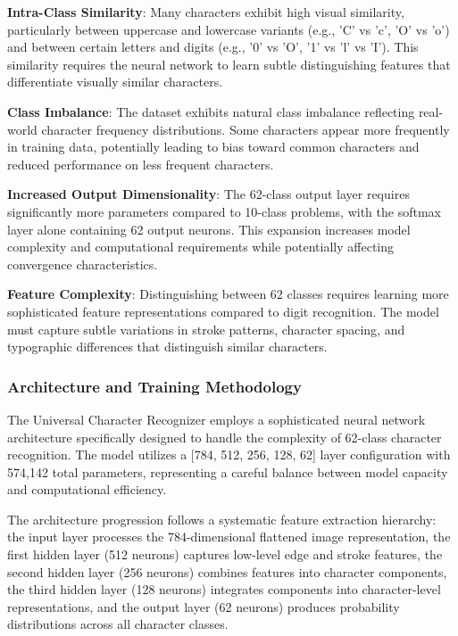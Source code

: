 \documentclass[11pt,a4paper]{report}
\begin{document}
\textbf{Intra-Class Similarity}: Many characters exhibit high visual similarity, particularly between uppercase and lowercase variants (e.g., 'C' vs 'c', 'O' vs 'o') and between certain letters and digits (e.g., '0' vs 'O', '1' vs 'l' vs 'I'). This similarity requires the neural network to learn subtle distinguishing features that differentiate visually similar characters.

\textbf{Class Imbalance}: The dataset exhibits natural class imbalance reflecting real-world character frequency distributions. Some characters appear more frequently in training data, potentially leading to bias toward common characters and reduced performance on less frequent characters.

\textbf{Increased Output Dimensionality}: The 62-class output layer requires significantly more parameters compared to 10-class problems, with the softmax layer alone containing 62 output neurons. This expansion increases model complexity and computational requirements while potentially affecting convergence characteristics.

\textbf{Feature Complexity}: Distinguishing between 62 classes requires learning more sophisticated feature representations compared to digit recognition. The model must capture subtle variations in stroke patterns, character spacing, and typographic differences that distinguish similar characters.

\subsubsection{Architecture and Training Methodology}

The Universal Character Recognizer employs a sophisticated neural network architecture specifically designed to handle the complexity of 62-class character recognition. The model utilizes a [784, 512, 256, 128, 62] layer configuration with 574,142 total parameters, representing a careful balance between model capacity and computational efficiency.

The architecture progression follows a systematic feature extraction hierarchy: the input layer processes the 784-dimensional flattened image representation, the first hidden layer (512 neurons) captures low-level edge and stroke features, the second hidden layer (256 neurons) combines features into character components, the third hidden layer (128 neurons) integrates components into character-level representations, and the output layer (62 neurons) produces probability distributions across all character classes.
\end{document}
